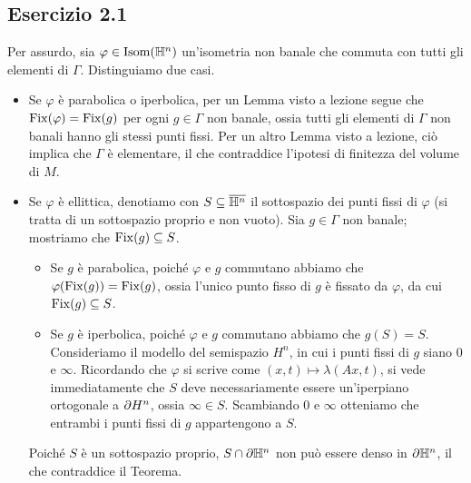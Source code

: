 \subsection*{Esercizio 2.1}
Per assurdo, sia $\varphi\in\operatorname{Isom}(\mathbb{H}^n)$ un'isometria non banale che commuta con tutti gli elementi di $\Gamma$. Distinguiamo due casi.
\begin{itemize}
\item Se $\varphi$ è parabolica o iperbolica, per un Lemma visto a lezione segue che $\operatorname{Fix}(\varphi)=\operatorname{Fix}(g)$ per ogni $g\in\Gamma$ non banale, ossia tutti gli elementi di $\Gamma$ non banali hanno gli stessi punti fissi. Per un altro Lemma visto a lezione, ciò implica che $\Gamma$ è elementare, il che contraddice l'ipotesi di finitezza del volume di $M$.
\item Se $\varphi$ è ellittica, denotiamo con $S\subseteq\overline{\mathbb{H}^n}$ il sottospazio dei punti fissi di $\varphi$ (si tratta di un sottospazio proprio e non vuoto). Sia $g\in\Gamma$ non banale; mostriamo che $\operatorname{Fix}(g)\subseteq S$.
\begin{itemize}
\item Se $g$ è parabolica, poiché $\varphi$ e $g$ commutano abbiamo che $\varphi(\operatorname{Fix}(g))=\operatorname{Fix}(g)$, ossia l'unico punto fisso di $g$ è fissato da $\varphi$, da cui $\operatorname{Fix}(g)\subseteq S$.
\item Se $g$ è iperbolica, poiché $\varphi$ e $g$ commutano abbiamo che $g(S)=S$. Consideriamo il modello del semispazio $H^n$, in cui i punti fissi di $g$ siano $0$ e $\infty$. Ricordando che $\varphi$ si scrive come $(x,t)\mapsto\lambda(Ax,t)$, si vede immediatamente che $S$ deve necessariamente essere un'iperpiano ortogonale a $\partial H^n$, ossia $\infty\in S$. Scambiando $0$ e $\infty$ otteniamo che entrambi i punti fissi di $g$ appartengono a $S$.
\end{itemize}
Poiché $S$ è un sottospazio proprio, $S\cap\partial\mathbb{H}^n$ non può essere denso in $\partial\mathbb{H}^n$, il che contraddice il Teorema.
\end{itemize}

